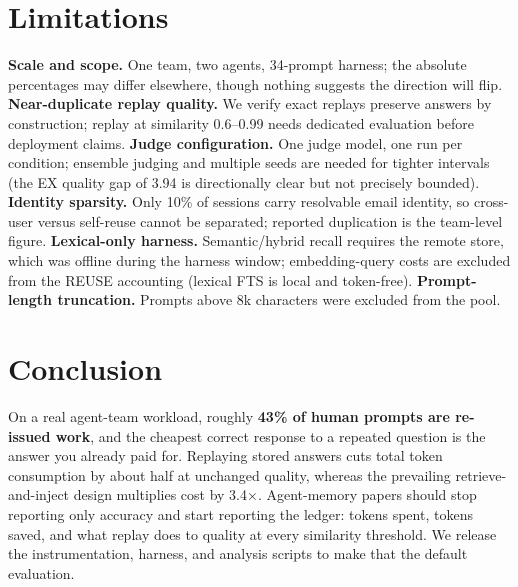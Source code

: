 \documentclass{article}
\begin{document}
\section{Limitations}
\label{sec:limits}
\textbf{Scale and scope.} One team, two agents, 34-prompt harness; the
absolute percentages may differ elsewhere, though nothing suggests the
direction will flip. \textbf{Near-duplicate replay quality.} We verify exact
replays preserve answers by construction; replay at similarity 0.6--0.99
needs dedicated evaluation before deployment claims. \textbf{Judge
configuration.} One judge model, one run per condition; ensemble judging and
multiple seeds are needed for tighter intervals (the EX quality gap of 3.94
is directionally clear but not precisely bounded). \textbf{Identity
sparsity.} Only 10\% of sessions carry resolvable email identity, so
cross-user versus self-reuse cannot be separated; reported duplication is
the team-level figure. \textbf{Lexical-only harness.} Semantic/hybrid recall
requires the remote store, which was offline during the harness window;
embedding-query costs are excluded from the REUSE accounting (lexical FTS is
local and token-free). \textbf{Prompt-length truncation.} Prompts above 8k
characters were excluded from the pool.

\section{Conclusion}
On a real agent-team workload, roughly \textbf{43\% of human prompts are
re-issued work}, and the cheapest correct response to a repeated question is
the answer you already paid for. Replaying stored answers cuts total token
consumption by about half at unchanged quality, whereas the prevailing
retrieve-and-inject design multiplies cost by 3.4$\times$. Agent-memory
papers should stop reporting only accuracy and start reporting the ledger:
tokens spent, tokens saved, and what replay does to quality at every
similarity threshold. We release the instrumentation, harness, and analysis
scripts to make that the default evaluation.



\end{document}
